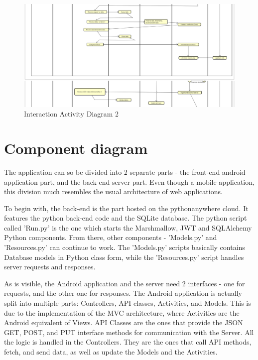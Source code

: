 \begin{figure}[H]
	\includegraphics[width=\linewidth]{diagrams/Interaction_Activity_Diag_2.png}
	\caption{Interaction Activity Diagram 2}
	\label{fig:register_activity_diag_2}
\end{figure}

\eject

\section{Component diagram}

The application can so be divided into 2 separate parts - the front-end android application part, and the back-end server part. Even though a mobile application, this division much resembles the usual architecture of web applications.

To begin with, the back-end is the part hosted on the pythonanywhere cloud. It features the python back-end code and the SQLite database. The python script called 'Run.py' is the one which starts the Marshmallow, JWT and SQLAlchemy Python components. From there, other components - 'Models.py' and 'Resources.py' can continue to work. The 'Models.py' scripts basically contains Database models in Python class form, while the 'Resources.py' script handles server requests and responses.

As is visible, the Android application and the server need 2 interfaces - one for requests, and the other one for responses. The Android application is actually split into multiple parts: Controllers, API classes, Activities, and Models. This is due to the implementation of the MVC architecture, where Activities are the Android equivalent of Views. API Classes are the ones that provide the JSON GET, POST, and PUT interface methods for communication with the Server. All the logic is handled in the Controllers. They are the ones that call API methods, fetch, and send data, as well as update the Models and the Activities.

